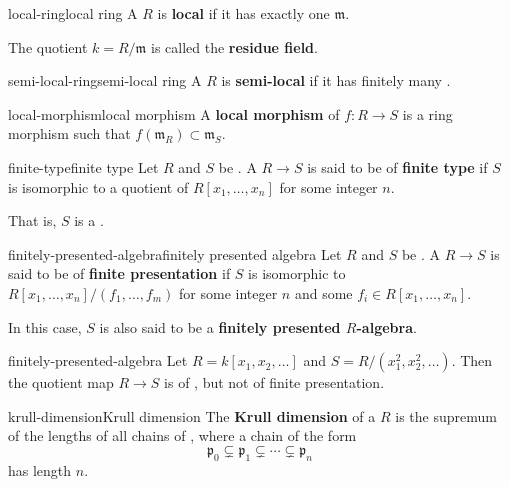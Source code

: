 \begin{topic}{local-ring}{local ring}
    A  $R$ is \textbf{local} if it has exactly one  $\mathfrak{m}$.
    
    The quotient $k = R/\mathfrak{m}$ is called the \textbf{residue field}.
\end{topic}

\begin{topic}{semi-local-ring}{semi-local ring}
    A  $R$ is \textbf{semi-local} if it has finitely many .
\end{topic}

\begin{topic}{local-morphism}{local morphism}
    A \textbf{local morphism} of  $f : R \to S$ is a ring morphism such that $f(\mathfrak{m}_R) \subset \mathfrak{m}_S$.
\end{topic}

\begin{topic}{finite-type}{finite type}
    Let $R$ and $S$ be . A  $R \to S$ is said to be of \textbf{finite type} if $S$ is isomorphic to a quotient of $R[x_1, \ldots, x_n]$ for some integer $n$.
    
    That is, $S$ is a .
\end{topic}

\begin{topic}{finitely-presented-algebra}{finitely presented algebra}
    Let $R$ and $S$ be . A  $R \to S$ is said to be of \textbf{finite presentation} if $S$ is isomorphic to $R[x_1, \ldots, x_n] / (f_1, \ldots, f_m)$ for some integer $n$ and some $f_i \in R[x_1, \ldots, x_n]$.
    
    In this case, $S$ is also said to be a \textbf{finitely presented $R$-algebra}.
\end{topic}

\begin{example}{finitely-presented-algebra}
    Let $R = k[x_1, x_2, \ldots]$ and $S = R / (x_1^2, x_2^2, \ldots)$. Then the quotient map $R \to S$ is of , but not of finite presentation.
\end{example}

\begin{topic}{krull-dimension}{Krull dimension}
    The \textbf{Krull dimension} of a  $R$ is the supremum of the lengths of all chains of , where a chain of the form
    \[ \mathfrak{p}_0 \subsetneq \mathfrak{p}_1 \subsetneq \cdots \subsetneq \mathfrak{p}_n \]
    has length $n$.
\end{topic}

